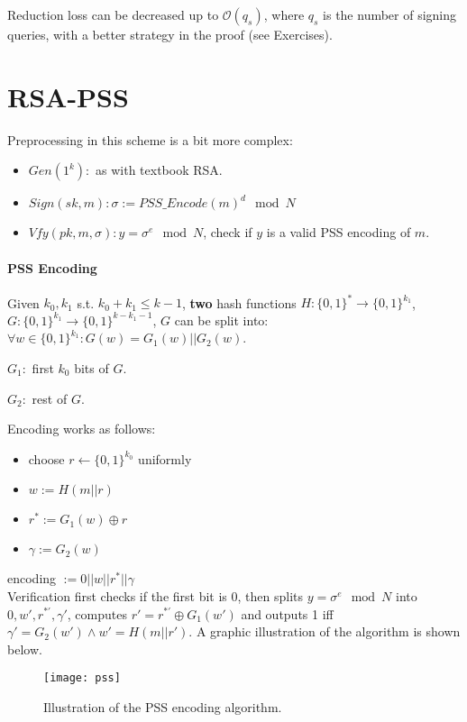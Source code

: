 \documentclass[oneside]{book}
\newcommand{\cO}[0]{\mathcal{O}}
\begin{document}
Reduction loss can be decreased up to $\cO(q_s)$, where $q_s$ is the number of signing queries, with a better strategy in the proof (see Exercises).

\section{RSA-PSS}
Preprocessing in this scheme is a bit more complex:
\begin{itemize}
    \item $Gen(1^k): $ as with textbook RSA.
    \item $Sign(sk, m): \sigma := PSS\_Encode(m)^d \mod N$
    \item $Vfy(pk, m, \sigma): y = \sigma^e \mod N$, check if $y$ is a valid PSS encoding of $m$.
\end{itemize}

\paragraph{PSS Encoding}
Given $k_0, k_1$ s.t. $k_0+k_1 \le k-1$, \textbf{two} hash functions $H: \{0,1\}^* \rightarrow \{0,1\}^{k_1}$, $G: \{0,1\}^{k_1} \rightarrow \{0,1\}^{k-k_1-1}$, $G$ can be split into: $\forall w \in \{0,1\}^{k_1}: G(w) = G_1(w) || G_2(w)$.

$G_1:$ first $k_0$ bits of $G$.

$G_2:$ rest of $G$.

Encoding works as follows:
\begin{itemize}
    \item choose $r \leftarrow \{0,1\}^{k_0}$ uniformly
    \item $w:= H(m||r)$
    \item $r^* :=  G_1(w) \oplus r$
    \item $\gamma := G_2(w)$
\end{itemize}

encoding $:= 0||w||r^*||\gamma$\\

Verification first checks if the first bit is 0, then splits $y = \sigma^e \mod N$ into $0, w', r^{*'}, \gamma'$, computes $r' = r^{*'} \oplus G_1(w')$ and outputs 1 iff $\gamma' = G_2(w') \land w' = H(m||r')$.
A graphic illustration of the algorithm is shown below.

\begin{figure}[H]
    \centering
    \texttt{[image: pss]}
    \caption{Illustration  of the PSS encoding algorithm.}
    \label{fig:pss_enc}
\end{figure}
\end{document}
